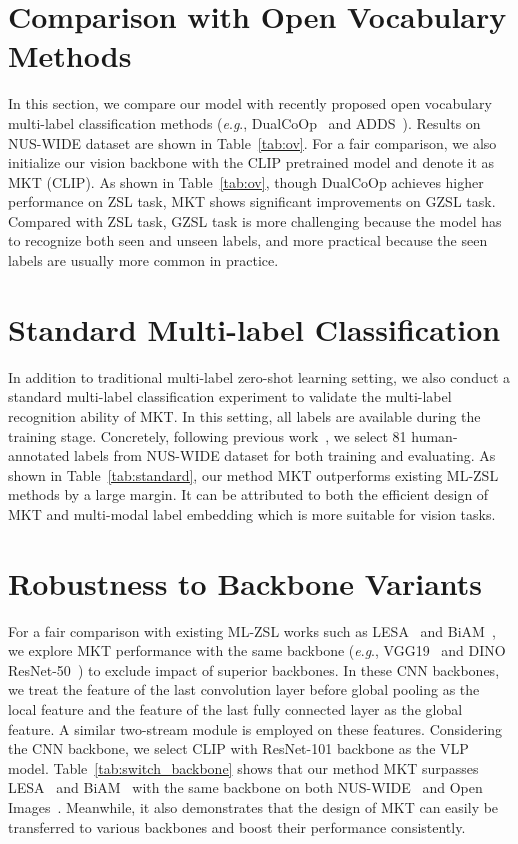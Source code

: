 \documentclass[letterpaper]{article} %
\newcommand{\eg}{\textit{e}.\textit{g}.}
\begin{document}
\section{Comparison with Open Vocabulary Methods}
In this section, we compare our model with recently proposed open vocabulary multi-label classification methods (\eg, DualCoOp~\cite{sun2022dualcoop} and ADDS~\cite{xu2022dual}). 
Results on NUS-WIDE dataset are shown in Table~\ref{tab:ov}.
For a fair comparison, we also initialize our vision backbone with the CLIP pretrained model and denote it as MKT (CLIP).
As shown in Table~\ref{tab:ov}, though DualCoOp achieves higher performance on ZSL task, MKT shows significant improvements on GZSL task. 
Compared with ZSL task, GZSL task is more challenging because the model has to recognize both seen and unseen labels, and more practical because the seen labels are usually more common in practice.



\section{Standard Multi-label Classification}
\label{standard}
In addition to traditional multi-label zero-shot learning setting, we also conduct a standard multi-label classification experiment to validate the multi-label recognition ability of MKT.
In this setting, all labels are available during the training stage.
Concretely, following previous work~\cite{biam}, we select 81 human-annotated labels from NUS-WIDE dataset for both training and evaluating.
As shown in Table~\ref{tab:standard}, our method MKT outperforms existing ML-ZSL methods by a large margin. 
It can be attributed to both the efficient design of MKT and multi-modal label embedding which is more suitable for vision tasks.


\section{Robustness to Backbone Variants}
\label{robustness}
For a fair comparison with existing ML-ZSL works such as LESA~\cite{lesa} and BiAM~\cite{biam}, we explore MKT performance with the same backbone (\eg, VGG19~\cite{vgg} and DINO ResNet-50~\cite{dino}) to exclude impact of superior backbones. 
In these CNN backbones, we treat the feature of the last convolution layer before global pooling as the local feature and the feature of the last fully connected layer as the global feature.
A similar two-stream module is employed on these features.
Considering the CNN backbone, we select CLIP with ResNet-101 backbone as the VLP model.
Table~\ref{tab:switch_backbone} shows that our method MKT surpasses LESA~\cite{lesa} and BiAM~\cite{biam} with the same backbone on both NUS-WIDE~\cite{nuswide} and Open Images~\cite{openiamge}.
Meanwhile, it also demonstrates that the design of MKT can easily be transferred to various backbones and boost their performance consistently.
\end{document}

